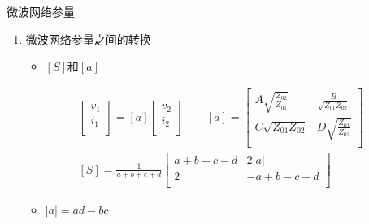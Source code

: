 \begin{frame}{微波网络参量}
    \begin{enumerate}
        \resume
        \item 微波网络参量之间的转换
        \begin{itemize}
            \item $[S]$和$[a]$
        \end{itemize}
        \begin{align*}
            \begin{bmatrix*}
                v_1 \\
                i_1 \\
            \end{bmatrix*}
            =[a]
            \begin{bmatrix*}
                v_2 \\
                i_2 \\
            \end{bmatrix*}
            \qquad
            [a]=
            \begin{bmatrix*}
                A\sqrt{\frac{Z_{02}}{Z_{01}}} & \frac{B}{\sqrt{Z_{01}Z_{02}}}  \\
                C\sqrt{Z_{01}Z_{02}} & D\sqrt{\frac{Z_{01}}{Z_{02}}} \\
            \end{bmatrix*}\\
            [S]=\frac{1}{a+b+c+d}
            \begin{bmatrix*}
                a+b-c-d & 2|{a}| \\
                2 & -a+b-c+d \\
            \end{bmatrix*} 
        \end{align*}
        \begin{itemize}
            \item $|a| = ad-bc$
        \end{itemize}
    \end{enumerate}
\end{frame}

